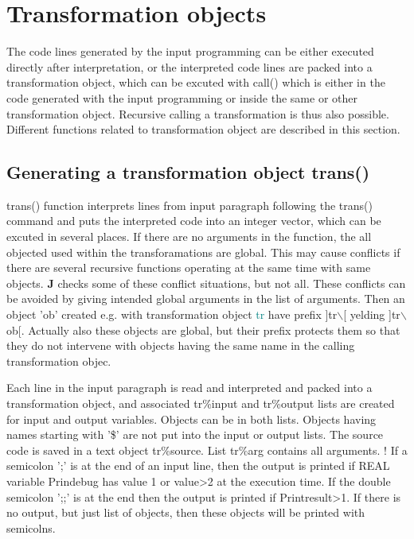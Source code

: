 \section{Transformation objects}
\label{Transformations}
The code lines generated by the input programming can be either
executed directly after interpretation, or the interpreted code lines
are packed into a transformation object, which can be excuted with \textcolor{VioletRed}{call}()
which is either in the code generated with the input programming
or inside the same or other transformation object. Recursive
calling a transformation is thus also possible. Different functions
related to transformation object are described in this section.
\subsection{Generating a transformation object \textcolor{VioletRed}{trans}()}
\label{trans}
\textcolor{VioletRed}{trans}() function interprets lines from input paragraph following the \textcolor{VioletRed}{trans}() command and puts the
interpreted code into an integer vector, which can be excuted in several places.
If there are no arguments in the function, the all objected used within the
transforamations are global. This may cause conflicts if there are several recursive
functions operating at the same time with same objects. \textbf{J} checks some of
these conflict situations, but not all.  These conflicts can be avoided by giving
intended global arguments  in the list of arguments.
Then an object 'ob' created e.g. with transformation object \textcolor{teal}{tr} have prefix
]tr$\backslash$[ yelding ]tr$\backslash$ob[. Actually also these objects are global, but their prefix
protects them so that they do not intervene with objects having the same name in the
calling transformation objec.

Each line in the input paragraph is read and interpreted and packed into a transformation
object, and associated tr\%input and tr\%output lists are created for input and output
variables. Objects can be in both lists. Objects having names starting
with '\$' are not put into the input or output lists. The source code is saved in a text object
tr\%source. List tr\%arg contains all arguments.
!
If a semicolon ';'  is at the end of an input line, then
the output is printed if REAL variable Prindebug has value 1 or value>2 at
the execution time. If the double semicolon ';;' is at the end then the output is
printed if Printresult>1. If there is no output, but just list of objects, then these
objects will be printed with semicolns.

